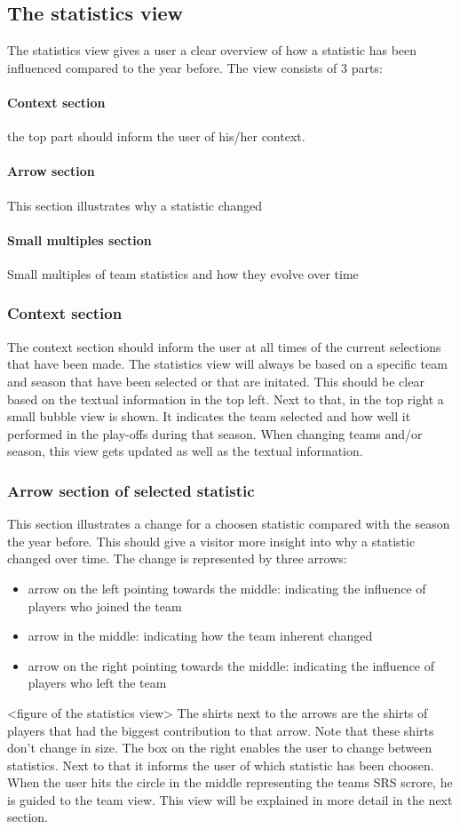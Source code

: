 \documentclass{sigchi}
\begin{document}
\subsection{The statistics view}
The statistics view gives a user a clear overview of how a statistic has been 
influenced compared to the year before. The view consists of 3 parts:
\paragraph{Context section} the top part should inform the user of his/her context.
\paragraph{Arrow section} This section illustrates why a statistic changed
\paragraph{Small multiples section} Small multiples of team statistics and how they evolve over time
\subsubsection{Context section}
The context section should inform the user at all times of the current selections 
that have been made. The statistics view will always be based on a specific team
and season that have been selected or that are initated. This should be clear based
on the textual information in the top left. Next to that, in the top right a small 
bubble view is shown. It indicates the team selected and how well it performed in 
the play-offs during that season. When changing teams and/or season, this view gets 
updated as well as the textual information.

\subsubsection{Arrow section of selected statistic}
This section illustrates a change for a choosen statistic compared with the season
the year before. This should give a visitor more insight into why a statistic changed
over time. The change is represented by three arrows:
\begin{itemize}
    \item arrow on the left pointing towards the middle: indicating the influence of players
    who joined the team
    \item arrow in the middle: indicating how the team inherent changed
    \item arrow on the right pointing towards the middle: indicating the influence of players
who left the team
\end{itemize}
<figure of the statistics view>
The shirts next to the arrows are the shirts of players that had the biggest 
contribution to that arrow. Note that these shirts don't change in size. The box on 
the right enables the user to change between 
statistics. Next to that it informs the user of which statistic has been choosen. When 
the user hits the circle in the middle representing the teams SRS scrore, he is guided 
to the team view. This view will be explained in more detail in the next section.
\end{document}
